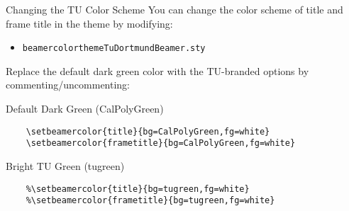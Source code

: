 \documentclass[aspectratio=169,xcolor=dvipsnames]{beamer}
\begin{document}

\begingroup
{}

\begin{frame}[fragile]{Changing the TU Color Scheme}
    You can change the color scheme of title and frame title in the theme by modifying:

    \begin{itemize}
        \item \texttt{beamercolorthemeTuDortmundBeamer.sty}
    \end{itemize}

Replace the default dark green color with the TU-branded options by commenting/uncommenting:

\begin{block}{Default Dark Green (CalPolyGreen)}
    \begin{verbatim}
    \setbeamercolor{title}{bg=CalPolyGreen,fg=white}
    \setbeamercolor{frametitle}{bg=CalPolyGreen,fg=white}
    \end{verbatim}
\end{block}

\begin{block}{Bright TU Green (tugreen)}
    \begin{verbatim}
    %\setbeamercolor{title}{bg=tugreen,fg=white}
    %\setbeamercolor{frametitle}{bg=tugreen,fg=white}
    \end{verbatim}
\end{block}
\end{frame}
\endgroup


\begin{frame}
    \begingroup
    \titlepage
    \endgroup
\end{frame}


\begingroup
{}
\end{document}
